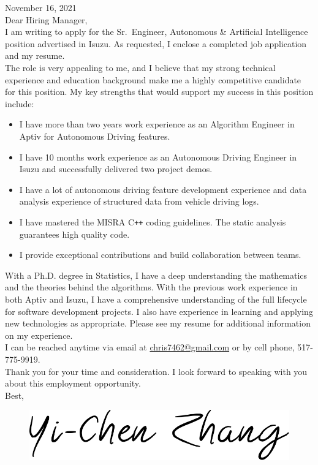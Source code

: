 \documentclass[a4paper,12pt,dvipdfmx]{article}
\begin{document}
\noindent November 16, 2021\\

\noindent Dear Hiring Manager,\\

\noindent I am writing to apply for the Sr.~Engineer, Autonomous \& Artificial Intelligence position advertised in Isuzu. As requested, I enclose a completed job application and my resume.\\

\noindent The role is very appealing to me, and I believe that my strong technical experience and education background make me a highly competitive candidate for this position. My key strengths that would support my success in this position include:

\begin{itemize}
  \item I have more than two years work experience as an Algorithm Engineer in Aptiv for Autonomous Driving features.
  \item I have 10 months work experience as an Autonomous Driving Engineer in Isuzu and successfully delivered two project demos.
  \item I have a lot of autonomous driving feature development experience and data analysis experience of structured data from vehicle driving logs.
  \item I have mastered the MISRA \textsf{C}\texttt{++} coding guidelines. The static analysis guarantees high quality code.
  \item I provide exceptional contributions and build collaboration between teams.
\end{itemize}

\noindent With a Ph.D. degree in Statistics, I have a deep understanding the mathematics and the theories behind the algorithms. With the previous work experience in both Aptiv and Isuzu, I have a comprehensive understanding of the full lifecycle for software development projects. I also have experience in learning and applying new technologies as appropriate. Please see my resume for additional information on my experience.\\

\noindent I can be reached anytime via email at \href{mailto:chris7462@gmail.com}{chris7462@gmail.com} or by cell phone, 517-775-9919.\\

\noindent Thank you for your time and consideration. I look forward to speaking with you about this employment opportunity.\\

\noindent Best,

\begin{figure}[!ht]
  \includegraphics[scale=0.12]{./Signature.png}
\end{figure}
\end{document}
